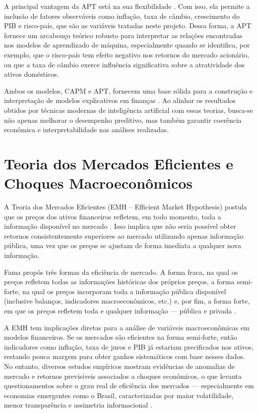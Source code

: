 \documentclass[	12pt, Times, openright, oneside, a4paper, english, brazil]{abntex2}
\begin{document}
A principal vantagem da APT está na sua flexibilidade \cite{Cho_Elton_Gruber_1984}. Com isso, ela permite a inclusão de fatores observáveis como inflação, taxa de câmbio, crescimento do PIB e risco-país, que são as variáveis tratadas neste projeto. Dessa forma, a APT fornece um arcabouço teórico robusto para interpretar as relações encontradas nos modelos de aprendizado de máquina, especialmente quando se identifica, por exemplo, que o risco-país tem efeito negativo nos retornos do mercado acionário, ou que a taxa de câmbio exerce influência significativa sobre a atratividade dos ativos domésticos.

Ambos os modelos, CAPM e APT, fornecem uma base sólida para a construção e interpretação de modelos explicativos em finanças \cite{Sun2001}. Ao alinhar os resultados obtidos por técnicas modernas de inteligência artificial com essas teorias, busca-se não apenas melhorar o desempenho preditivo, mas também garantir coerência econômica e interpretabilidade nas análises realizadas.

\section{Teoria dos Mercados Eficientes e Choques Macroeconômicos}

A Teoria dos Mercados Eficientes (EMH – Efficient Market Hypothesis) postula que os preços dos ativos financeiros refletem, em todo momento, toda a informação disponível no mercado \cite{Fama1970Efficient}. Isso implica que não seria possível obter retornos consistentemente superiores ao mercado utilizando apenas informação pública, uma vez que os preços se ajustam de forma imediata a qualquer nova informação.

Fama propôs três formas da eficiência de mercado. A forma fraca, na qual os preços refletem todas as informações históricas dos próprios preços, a forma semi-forte, na qual os preços incorporam toda a informação pública disponível (inclusive balanços, indicadores macroeconômicos, etc.) e, por fim, a forma forte, em que os preços refletem toda e qualquer informação — pública e privada \cite{Yen2008}.

A EMH tem implicações diretas para a análise de variáveis macroeconômicas em modelos financeiros. Se os mercados são eficientes na forma semi-forte, então indicadores como inflação, taxa de juros e PIB já estariam precificados nos ativos, restando pouca margem para obter ganhos sistemáticos com base nesses dados. No entanto, diversos estudos empíricos mostram evidências de anomalias de mercado e retornos previsíveis associados a choques econômicos, o que levanta questionamentos sobre o grau real de eficiência dos mercados — especialmente em economias emergentes como o Brasil, caracterizadas por maior volatilidade, menor transparência e assimetria informacional \cite{Belo2006}.
\end{document}
